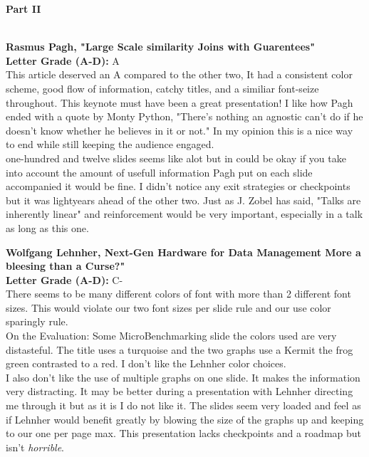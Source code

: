 \documentclass[11pt]{article}
\newcommand\LGRADE{\vspace{.10in}\textbf{Letter Grade (A-D):  }} \\
\newcommand\PARTII{\vspace{.10in}\textbf{Part II \\}}
\begin{document}
\PARTII \\


\newline

\textbf{Rasmus Pagh, "Large Scale similarity Joins with Guarentees" } \\
\LGRADE A \\
This article deserved an A compared to the other two, It had a consistent color scheme,
good flow of information, catchy titles, and a similiar font-seize throughout. This
keynote must have been a great presentation! I like how Pagh ended with a quote by Monty Python, 
"There's nothing an agnostic can't do if he doesn't know whether he believes in it or not." 
In my opinion this is a nice way to end while still keeping the audience engaged. \\ 
one-hundred and twelve slides seems like alot but in could be okay if you take into account
the amount of usefull information Pagh put on each slide accompanied it would be fine. I 
didn't notice any exit strategies or checkpoints but it was lightyears ahead of the other two.
Just as J. Zobel has said, "Talks are inherently linear" and reinforcement would be very 
important, especially in a talk as long as this one. \\

\newpage

\textbf{Wolfgang Lehnher, Next-Gen Hardware for Data Management More a bleesing than a Curse?"}\\
\LGRADE C- \\

There seems to be many different colors of font with more than 2 different font sizes. This would violate our 
two font sizes per slide rule and our use color sparingly rule.\\
On the Evaluation: Some MicroBenchmarking slide the colors used are very distasteful. 
The title uses a turquoise and the two graphs use a Kermit the frog green contrasted to a red. 
I don't like the Lehnher color choices. \\
I also don't like the use of multiple graphs on one slide. It makes the information very distracting. 
It may be better during a presentation with Lehnher directing me through it but as it is I do not like it.
The slides seem very loaded and feel as if Lehnher would benefit greatly by blowing the size of the graphs 
up and keeping to our one per page max. 
This presentation lacks checkpoints and a roadmap but isn't \textit{horrible}. \\
\end{document}
